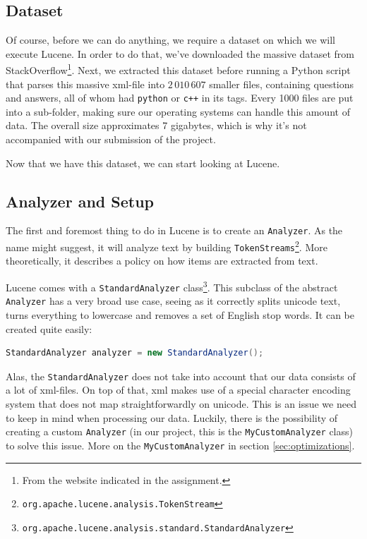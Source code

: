 \documentclass[11pt]{article}
\begin{document}
\subsection{Dataset}
Of course, before we can do anything, we require a dataset on which we will execute Lucene. In order to do that, we've downloaded the massive dataset from StackOverflow\footnote{From the website indicated in the assignment.}. Next, we extracted this dataset before running a Python script that parses this massive xml-file into $2\,010\,607$ smaller files, containing questions and answers, all of whom had \texttt{python} or \texttt{c++} in its tags. Every 1000 files are put into a sub-folder, making sure our operating systems can handle this amount of data. The overall size approximates 7 gigabytes, which is why it's not accompanied with our submission of the project.

Now that we have this dataset, we can start looking at Lucene.

\subsection{Analyzer and Setup}\label{sec:analysetup}
The first and foremost thing to do in Lucene is to create an \texttt{Analyzer}. As the name might suggest, it will analyze text by building \texttt{TokenStreams}\footnote{\texttt{org.apache.lucene.analysis.TokenStream}}. More theoretically, it describes a policy on how items are extracted from text.

Lucene comes with a \texttt{StandardAnalyzer} class\footnote{\texttt{org.apache.lucene.analysis.standard.StandardAnalyzer}}. This subclass of the abstract \texttt{Analyzer} has a very broad use case, seeing as it correctly splits unicode text, turns everything to lowercase and removes a set of English stop words. It can be created quite easily:
\begin{lstlisting}[language=Java]
StandardAnalyzer analyzer = new StandardAnalyzer();
\end{lstlisting}

Alas, the \texttt{StandardAnalyzer} does not take into account that our data consists of a lot of xml-files. On top of that, xml makes use of a special character encoding system that does not map straightforwardly on unicode. This is an issue we need to keep in mind when processing our data. Luckily, there is the possibility of creating a custom \texttt{Analyzer} (in our project, this is the \texttt{MyCustomAnalyzer} class) to solve this issue. More on the \texttt{MyCustomAnalyzer} in section \ref{sec:optimizations}.
\end{document}
